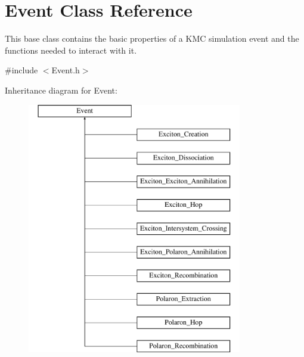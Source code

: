 \hypertarget{class_event}{}\section{Event Class Reference}
\label{class_event}


This base class contains the basic properties of a K\+MC simulation event and the functions needed to interact with it.  




{\ttfamily \#include $<$Event.\+h$>$}

Inheritance diagram for Event\+:\begin{figure}[H]
\begin{center}
\leavevmode
\includegraphics[height=11.000000cm]{class_event}
\end{center}
\end{figure}
